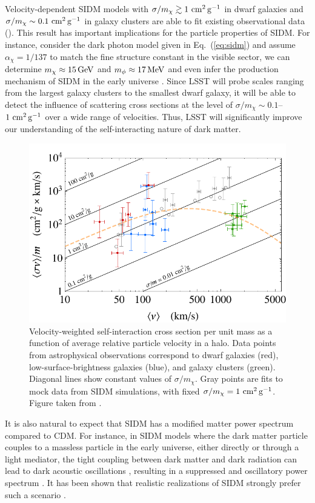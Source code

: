 Velocity-dependent SIDM models with $\sigma/m_\chi \gtrsim 1 \mathrm{\,\mathrm{\,cm}^2\mathrm{\,g}^{-1}}$ in dwarf galaxies and $\sigma/m_\chi \sim 0.1 \mathrm{\,\mathrm{\,cm}^2\mathrm{\,g}^{-1}}$ in galaxy clusters are able to fit existing observational data (). This result has important implications for the particle properties of SIDM. For instance, consider the dark photon model given in Eq.~(\ref{eq:sidm}) and assume $\alpha_\chi=1/137$ to match the fine structure constant in the visible sector, we can determine $m_\chi\approx 15 \mathrm{\,GeV}$ and $m_\phi \approx 17 \mathrm{\,MeV}$ \citep{Kaplinghat:2015aga} and even infer the production mechanism of SIDM in the early universe \citep{Huo:2017vef}. Since LSST will probe scales ranging from the largest galaxy clusters to the smallest dwarf galaxy, it will be able to detect the influence of scattering cross sections at the level of $\sigma/m_\chi \sim 0.1$--$1 \mathrm{\,\mathrm{\,cm}^2\mathrm{\,g}^{-1}}$ over a wide range of velocities. Thus, LSST will significantly improve our understanding of the self-interacting nature of dark matter. 

\begin{figure}
\centering
\includegraphics[width=0.6\columnwidth]{figures/sigmav.pdf}
\caption{Velocity-weighted self-interaction cross section per unit mass as a function of average relative particle velocity in a halo. Data points from astrophysical observations correspond to dwarf galaxies (red), low-surface-brightness galaxies (blue), and galaxy clusters (green). 
Diagonal lines show constant values of $\sigma/m_\chi$. 
Gray points are fits to mock data from SIDM simulations, with fixed $\sigma/m_\chi = 1 \mathrm{\,\mathrm{\,cm}^2\mathrm{\,g}^{-1}}$.
Figure taken from \citet{Kaplinghat:2015aga}.
}
\label{fig:sidm_sigma}
\end{figure}

It is also natural to expect that SIDM has a modified matter power spectrum compared to CDM. For instance, in SIDM models where the dark matter particle couples to a massless particle in the early universe, either directly or through a light mediator, the tight coupling between dark matter and dark radiation can lead to dark acoustic oscillations \citep{Cyr-Racine:2013ab,Cyr-Racine:2013fsa}, resulting in a suppressed and oscillatory power spectrum \citep[\eg][]{1992ApJ...398...43C,Boehm:2001hm,Boehm:2004th,Feng:2009mn,Aarssen:2012fx}. It has been shown that realistic realizations of SIDM strongly prefer such a scenario \citep{ Huo:2017vef}.

